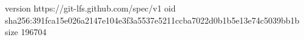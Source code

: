 version https://git-lfs.github.com/spec/v1
oid sha256:391fca15e026a2147e104e3f3a5537e5211ccba7022d0b1b5e13e74c5039bb1b
size 196704
